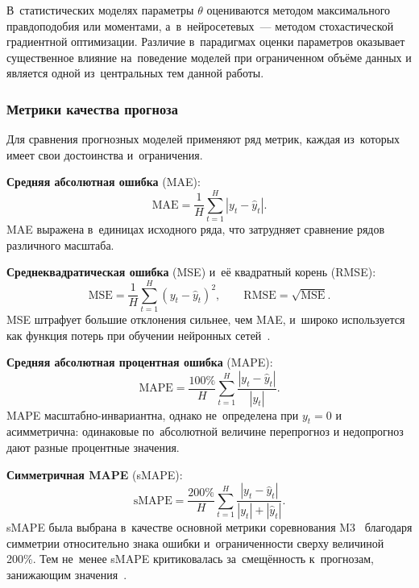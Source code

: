 В~статистических моделях параметры $\theta$ оцениваются методом
максимального правдоподобия или моментами, а~в~нейросетевых~---
методом стохастической градиентной оптимизации.  Различие в~парадигмах
оценки параметров оказывает существенное влияние на~поведение моделей
при ограниченном объёме данных и является одной из~центральных тем
данной работы.


\subsubsection{Метрики качества прогноза}
\label{sssec:metrics}

Для сравнения прогнозных моделей применяют ряд метрик, каждая из~которых
имеет свои достоинства и~ограничения.

\textbf{Средняя абсолютная ошибка} (MAE):
\begin{equation}
\label{eq:mae}
\mathrm{MAE} = \frac{1}{H}\sum_{t=1}^{H} |y_t - \hat{y}_t|.
\end{equation}
MAE выражена в~единицах исходного ряда, что затрудняет сравнение рядов
различного масштаба.

\textbf{Среднеквадратическая ошибка} (MSE) и~её квадратный корень (RMSE):
\begin{equation}
\label{eq:mse}
\mathrm{MSE} = \frac{1}{H}\sum_{t=1}^{H} (y_t - \hat{y}_t)^2,
\qquad
\mathrm{RMSE} = \sqrt{\mathrm{MSE}}.
\end{equation}
MSE штрафует большие отклонения сильнее, чем MAE, и~широко используется
как функция потерь при обучении нейронных сетей~\cite{goodfellow2016deep}.

\textbf{Средняя абсолютная процентная ошибка} (MAPE):
\begin{equation}
\label{eq:mape}
\mathrm{MAPE} = \frac{100\%}{H}\sum_{t=1}^{H} \frac{|y_t - \hat{y}_t|}{|y_t|}.
\end{equation}
MAPE масштабно-инвариантна, однако не~определена при $y_t = 0$ и
асимметрична: одинаковые по~абсолютной величине перепрогноз и
недопрогноз дают разные процентные значения.

\textbf{Симметричная MAPE} (sMAPE):
\begin{equation}
\label{eq:smape}
\mathrm{sMAPE} = \frac{200\%}{H}\sum_{t=1}^{H}
   \frac{|y_t - \hat{y}_t|}{|y_t| + |\hat{y}_t|}.
\end{equation}
sMAPE была выбрана в~качестве основной метрики соревнования
M3~\cite{makridakis2000m3} благодаря симметрии относительно знака
ошибки и~ограниченности сверху величиной 200\%.  Тем не~менее
sMAPE критиковалась за~смещённость к~прогнозам, занижающим
значения~\cite{hyndman2006accuracy}.

